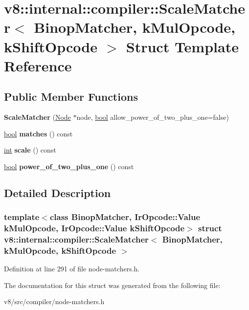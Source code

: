 \hypertarget{structv8_1_1internal_1_1compiler_1_1ScaleMatcher}{}\section{v8\+:\+:internal\+:\+:compiler\+:\+:Scale\+Matcher$<$ Binop\+Matcher, k\+Mul\+Opcode, k\+Shift\+Opcode $>$ Struct Template Reference}
\label{structv8_1_1internal_1_1compiler_1_1ScaleMatcher}
\subsection*{Public Member Functions}
\begin{DoxyCompactItemize}
\item 
\mbox{\label{structv8_1_1internal_1_1compiler_1_1ScaleMatcher_a1c525a631da9105712e41efe3742906c}} 
{\bfseries Scale\+Matcher} (\mbox{\hyperlink{classv8_1_1internal_1_1compiler_1_1Node}{Node}} $\ast$node, \mbox{\hyperlink{classbool}{bool}} allow\+\_\+power\+\_\+of\+\_\+two\+\_\+plus\+\_\+one=false)
\item 
\mbox{\label{structv8_1_1internal_1_1compiler_1_1ScaleMatcher_af9349fcfdc4e911cfa64fcbf100768cc}} 
\mbox{\hyperlink{classbool}{bool}} {\bfseries matches} () const
\item 
\mbox{\label{structv8_1_1internal_1_1compiler_1_1ScaleMatcher_aff1b0589a2fdf7667b8b3e3b05cad036}} 
\mbox{\hyperlink{classint}{int}} {\bfseries scale} () const
\item 
\mbox{\label{structv8_1_1internal_1_1compiler_1_1ScaleMatcher_a3b1eec0774f7df13b31aef8b05c9a964}} 
\mbox{\hyperlink{classbool}{bool}} {\bfseries power\+\_\+of\+\_\+two\+\_\+plus\+\_\+one} () const
\end{DoxyCompactItemize}


\subsection{Detailed Description}
\subsubsection*{template$<$class Binop\+Matcher, Ir\+Opcode\+::\+Value k\+Mul\+Opcode, Ir\+Opcode\+::\+Value k\+Shift\+Opcode$>$\newline
struct v8\+::internal\+::compiler\+::\+Scale\+Matcher$<$ Binop\+Matcher, k\+Mul\+Opcode, k\+Shift\+Opcode $>$}



Definition at line 291 of file node-\/matchers.\+h.



The documentation for this struct was generated from the following file\+:\begin{DoxyCompactItemize}
\item 
v8/src/compiler/node-\/matchers.\+h\end{DoxyCompactItemize}
